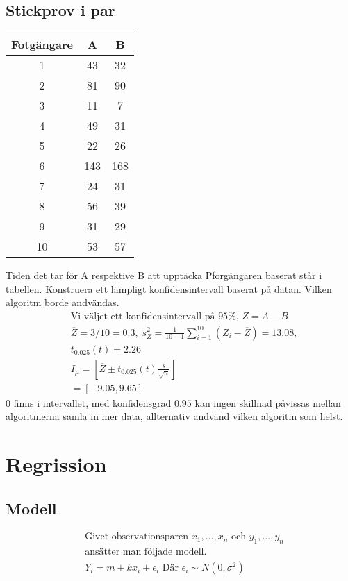 \begin{multicols}{2}
\subsection{Stickprov i par}
\begin{tabular}{c|c|c}
 Fotgängare &  A & B \\
 \hline
     1      & 43  & 32 \\
     2      & 81  & 90 \\
     3      & 11  & 7 \\
     4      & 49  & 31 \\
     5      & 22  & 26 \\
     6      & 143 & 168 \\
     7      & 24  & 31 \\
     8      & 56  & 39 \\
     9      & 31  & 29 \\
    10      & 53  & 57 \\
\end{tabular}
Tiden det tar för A respektive B att upptäcka
Pforgängaren baserat står i tabellen.
Konstruera ett lämpligt konfidensintervall baserat på datan. Vilken algoritm borde andvändas.
\begin{align*}
  &\text{Vi väljet ett konfidensintervall på $95\%$, } Z=A-B \\
  &\overline{Z}=3/10=0.3, \; s^2_Z=\frac{1}{10-1}\sum_{i=1}^{10}(Z_i-\overline{Z})=13.08, \\
  &t_{0.025}(t)=2.26 \\
  &I_{\mu} = [\overline{Z}\pm t_{0.025}(t)\frac{s}{\sqrt{n}}] \\
  &        = [-9.05, 9.65]
\end{align*}
$0$ finns i intervallet, med konfidensgrad $0.95$ kan ingen
skillnad påvissas mellan algoritmerna samla in mer data,
allternativ andvänd vilken algoritm som helst.


\section{Regrission}
\subsection{Modell}
\begin{align*}
  &\text{Givet observationsparen $x_1,...,x_n$ och $y_1,...,y_n$} \\
  &\text{ansätter man följade modell.} \\
  &Y_i = m+kx_i+\epsilon_i \text{ Där } \epsilon_i\sim{N(0,\sigma^2)} \\
\end{align*}


\end{multicols}
